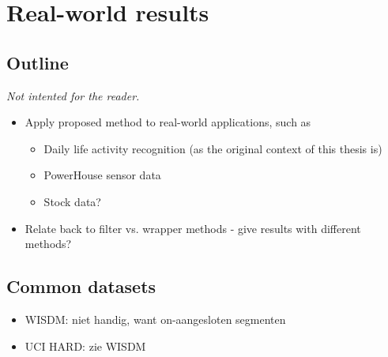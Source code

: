 
\chapter{Real-world results}

\label{Chapter6} %


\section{Outline}
\emph{Not intented for the reader.}
\begin{itemize}
  \item Apply proposed method to real-world applications, such as
    \begin{itemize}
      \item Daily life activity recognition (as the original context of this thesis is)
      \item PowerHouse sensor data
      \item Stock data?
    \end{itemize}
  \item Relate back to filter vs. wrapper methods - give results with different methods?
\end{itemize}

\section{Common datasets}
\begin{itemize}
  \item WISDM: niet handig, want on-aangesloten segmenten
  \item UCI HARD: zie WISDM
\end{itemize}

